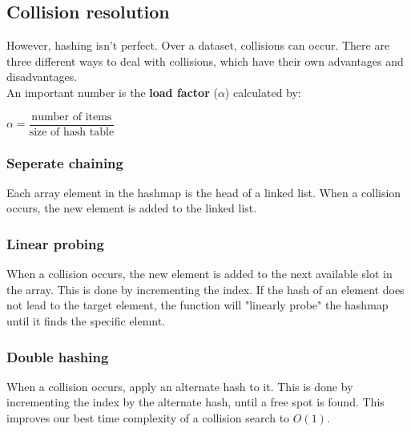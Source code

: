 \documentclass[14]{article}
\begin{document}
\subsection{Collision resolution}
However, hashing isn't perfect. Over a dataset, collisions can occur. There are three different ways to deal with collisions, 
which have their own advantages and disadvantages.  \\ 
An important number is the \textbf{load factor} ($\alpha$) calculated by:
\begin{center}
    $\alpha = \dfrac{\text{number of items}}{\text{size of hash table}}$
\end{center}
\subsubsection{Seperate chaining}
Each array element in the hashmap is the head of a linked list. When a collision occurs, the new element is added to the linked list.
\subsubsection{Linear probing}
When a collision occurs, the new element is added to the next available slot in the array. This is done by incrementing the index.
If the hash of an element does not lead to the target element, the function will "linearly probe" the hashmap until it
finds the specific elemnt. 
\subsubsection{Double hashing}  
When a collision occurs, apply an alternate hash to it. This is done by incrementing the index by the alternate hash, until a
free spot is found. This improves our best time complexity of a collision search to $O(1)$.
\end{document}
